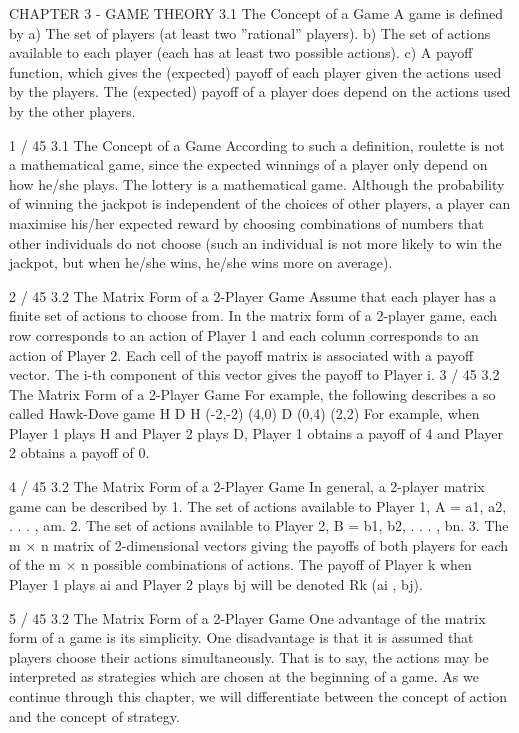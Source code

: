 \documentclass[]{report}
\begin{document}
	

CHAPTER 3 - GAME THEORY
3.1 The Concept of a Game
A game is defined by
a) The set of players (at least two ”rational” players).
b) The set of actions available to each player (each has at least
two possible actions).
c) A payoff function, which gives the (expected) payoff of each
player given the actions used by the players. The (expected) payoff
of a player does depend on the actions used by the other players.

1 / 45
3.1 The Concept of a Game
According to such a definition, roulette is not a mathematical
game, since the expected winnings of a player only depend on how
he/she plays.
The lottery is a mathematical game. Although the probability of
winning the jackpot is independent of the choices of other players,
a player can maximise his/her expected reward by choosing
combinations of numbers that other individuals do not choose
(such an individual is not more likely to win the jackpot, but when
he/she wins, he/she wins more on average).

2 / 45
3.2 The Matrix Form of a 2-Player Game
Assume that each player has a finite set of actions to choose from.
In the matrix form of a 2-player game, each row corresponds to an
action of Player 1 and each column corresponds to an action of
Player 2.
Each cell of the payoff matrix is associated with a payoff vector.
The i-th component of this vector gives the payoff to Player i.
3 / 45
3.2 The Matrix Form of a 2-Player Game
For example, the following describes a so called Hawk-Dove game
H D
H (-2,-2) (4,0)
D (0,4) (2,2)
For example, when Player 1 plays H and Player 2 plays D, Player 1
obtains a payoff of 4 and Player 2 obtains a payoff of 0.

4 / 45
3.2 The Matrix Form of a 2-Player Game
In general, a 2-player matrix game can be described by
1. The set of actions available to Player 1,
A = {a1, a2, . . . , am}.
2. The set of actions available to Player 2,
B = {b1, b2, . . . , bn}.
3. The m × n matrix of 2-dimensional vectors giving the
payoffs of both players for each of the m × n possible
combinations of actions. The payoff of Player k when
Player 1 plays ai and Player 2 plays bj will be
denoted Rk (ai
, bj).

5 / 45
3.2 The Matrix Form of a 2-Player Game
One advantage of the matrix form of a game is its simplicity.
One disadvantage is that it is assumed that players choose their
actions simultaneously. That is to say, the actions may be
interpreted as strategies which are chosen at the beginning of a
game.
As we continue through this chapter, we will differentiate between
the concept of action and the concept of strategy.
\end{document}
